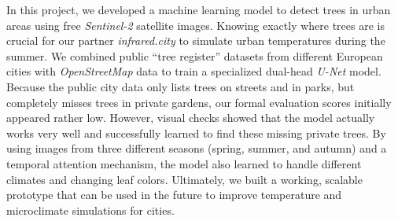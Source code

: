 In this project, we developed a machine learning model to detect trees in urban areas using free \textit{Sentinel-2} satellite images. Knowing exactly where trees are is crucial for our partner \textit{infrared.city} to simulate urban temperatures during the summer. We combined public ``tree register'' datasets from different European cities with \textit{OpenStreetMap} data to train a specialized dual-head \textit{U-Net} model. Because the public city data only lists trees on streets and in parks, but completely misses trees in private gardens, our formal evaluation scores initially appeared rather low. However, visual checks showed that the model actually works very well and successfully learned to find these missing private trees. By using images from three different seasons (spring, summer, and autumn) and a temporal attention mechanism, the model also learned to handle different climates and changing leaf colors. Ultimately, we built a working, scalable prototype that can be used in the future to improve temperature and microclimate simulations for cities.
